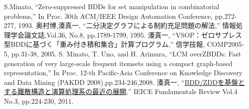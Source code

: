 \documentclass[a4paper]{jsbook}
\begin{document}
\begin{thebibliography}{9}
	\label{sect:bib}
   S.Minato,
		``Zero-suppressed BDDs for set manipulation in combinatorial problems,''
		In Proc. 30th ACM/IEEE Design Automation Conference, pp.272-277, 1993.
   奥村博,湊真一,
		``二分決定グラフによる制約充足問題の解法,''
		情報処理学会論文誌,Vol.36, No.8, pp.1789-1799, 1995.
   湊真一,
		``VSOP：ゼロサプレス型BDDに基づく「重み付き積和集合」計算プログラム,''
		信学技報, COMP2005-5, pp.31-38, 2005.
   S. Minato, T. Uno, and H. Arimura,
		``LCM overZBDDs: Fast generation of very large-scale frequent itemsets using a compact graph-based representation,''
		In Proc. 12-th Pacific-Asia Conference on Knowledge Discovery and Data Mining (PAKDD 2008),pp.234-246,2008.
   湊真一,
		``\href{https://www.jstage.jst.go.jp/article/essfr/4/3/4_3_224/_pdf}{BDD/ZDDを基盤とする離散構造と演算処理系の最近の展開},''
    IEICE Fundamentals Review Vol.4 No.3,
    pp.224-230, 2011.

\end{thebibliography}
\end{document}
